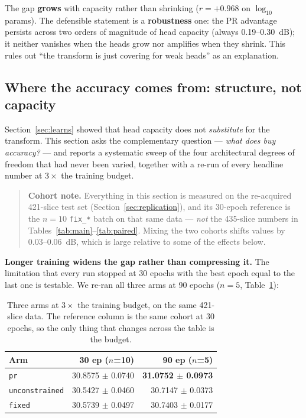 \documentclass[conference]{IEEEtran}
\begin{document}
The gap \textbf{grows} with capacity rather than shrinking ($r = +0.968$ on
$\log_{10}$ params). The defensible statement is a \textbf{robustness} one: the PR
advantage persists across two orders of magnitude of head capacity (always
0.19--0.30~dB); it neither vanishes when the heads grow nor amplifies when they
shrink. This rules out ``the transform is just covering for weak heads'' as an
explanation.

\subsection{Where the accuracy comes from: structure, not capacity}
\label{sec:structure}

Section~\ref{sec:learns} showed that head capacity does not \emph{substitute} for
the transform. This section asks the complementary question --- \emph{what does
buy accuracy?} --- and reports a systematic sweep of the four architectural
degrees of freedom that had never been varied, together with a re-run of every
headline number at $3\times$ the training budget.

\begin{quote}
\small\textbf{Cohort note.} Everything in this section is measured on the
re-acquired 421-slice test set (Section~\ref{sec:replication}), and its
30-epoch reference is the $n=10$ \texttt{fix\_*} batch on that same data ---
\emph{not} the 435-slice numbers in Tables~\ref{tab:main}--\ref{tab:paired}.
Mixing the two cohorts shifts values by 0.03--0.06~dB, which is large relative
to some of the effects below.
\end{quote}

\textbf{Longer training widens the gap rather than compressing it.} The
limitation that every run stopped at 30 epochs with the best epoch equal to the
last one is testable. We re-ran all three arms at 90 epochs ($n=5$,
Table~\ref{tab:conv}):

\begin{table}[t]
\centering
\caption{Three arms at $3\times$ the training budget, on the same 421-slice data.
The reference column is the same cohort at 30 epochs, so the only thing that
changes across the table is the budget.}
\label{tab:conv}
\small
\setlength{\tabcolsep}{3pt}
\begin{tabular}{@{}lrr@{}}
\toprule
Arm & 30 ep ($n$=10) & 90 ep ($n$=5)\\
\midrule
\texttt{pr} & 30.8575 $\pm$ 0.0740 & \textbf{31.0752 $\pm$ 0.0973}\\
\texttt{unconstrained} & 30.5427 $\pm$ 0.0460 & 30.7147 $\pm$ 0.0373\\
\texttt{fixed} & 30.5739 $\pm$ 0.0497 & 30.7403 $\pm$ 0.0177\\
\bottomrule
\end{tabular}
\end{table}
\end{document}
